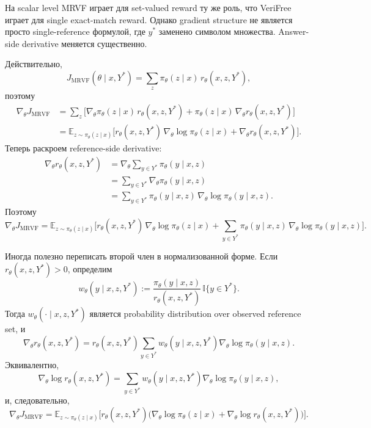 На scalar level MRVF играет для set-valued reward ту же роль, что VeriFree играет для single exact-match reward. Однако gradient structure не является просто single-reference формулой, где \(y^{*}\) заменено символом множества. Answer-side derivative меняется существенно.

Действительно,
\[
    J_{\mathrm{MRVF}}(\theta\mid x,Y^{*})
    =
    \sum_{z}\pi_{\theta}(z\mid x)\,r_{\theta}(x,z,Y^{*}),
\]
поэтому
\begin{align*}
    \nabla_{\theta}J_{\mathrm{MRVF}}
     & =
    \sum_{z}
    \Big[
        \nabla_{\theta}\pi_{\theta}(z\mid x)\,r_{\theta}(x,z,Y^{*})
        +
        \pi_{\theta}(z\mid x)\,\nabla_{\theta}r_{\theta}(x,z,Y^{*})
    \Big] \\
     & =
    \mathbb{E}_{z\sim\pi_{\theta}(z\mid x)}
    \Big[
        r_{\theta}(x,z,Y^{*})\,\nabla_{\theta}\log\pi_{\theta}(z\mid x)
        +
        \nabla_{\theta}r_{\theta}(x,z,Y^{*})
        \Big].
\end{align*}
Теперь раскроем reference-side derivative:
\begin{align*}
    \nabla_{\theta}r_{\theta}(x,z,Y^{*})
     & =
    \nabla_{\theta}
    \sum_{y\in Y^{*}}\pi_{\theta}(y\mid x,z) \\
     & =
    \sum_{y\in Y^{*}}
    \nabla_{\theta}\pi_{\theta}(y\mid x,z)   \\
     & =
    \sum_{y\in Y^{*}}
    \pi_{\theta}(y\mid x,z)\,\nabla_{\theta}\log\pi_{\theta}(y\mid x,z).
\end{align*}
Поэтому
\[
    \nabla_{\theta}J_{\mathrm{MRVF}}
    =
    \mathbb{E}_{z\sim\pi_{\theta}(z\mid x)}
    \Bigg[
        r_{\theta}(x,z,Y^{*})\,\nabla_{\theta}\log\pi_{\theta}(z\mid x)
        +
        \sum_{y\in Y^{*}}
        \pi_{\theta}(y\mid x,z)\,\nabla_{\theta}\log\pi_{\theta}(y\mid x,z)
        \Bigg].
\]

Иногда полезно переписать второй член в нормализованной форме. Если \(r_{\theta}(x,z,Y^{*})>0\), определим
\[
    w_{\theta}(y\mid x,z,Y^{*})
    :=
    \frac{\pi_{\theta}(y\mid x,z)}{r_{\theta}(x,z,Y^{*})}
    \,\mathbb{I}\{y\in Y^{*}\}.
\]
Тогда \(w_{\theta}(\cdot\mid x,z,Y^{*})\) является probability distribution over observed reference set, и
\[
    \nabla_{\theta}r_{\theta}(x,z,Y^{*})
    =
    r_{\theta}(x,z,Y^{*})
    \sum_{y\in Y^{*}}
    w_{\theta}(y\mid x,z,Y^{*})
    \nabla_{\theta}\log\pi_{\theta}(y\mid x,z).
\]
Эквивалентно,
\[
    \nabla_{\theta}\log r_{\theta}(x,z,Y^{*})
    =
    \sum_{y\in Y^{*}}
    w_{\theta}(y\mid x,z,Y^{*})
    \nabla_{\theta}\log\pi_{\theta}(y\mid x,z),
\]
и, следовательно,
\[
    \nabla_{\theta}J_{\mathrm{MRVF}}
    =
    \mathbb{E}_{z\sim\pi_{\theta}(z\mid x)}
    \Big[
        r_{\theta}(x,z,Y^{*})
        \big(
        \nabla_{\theta}\log\pi_{\theta}(z\mid x)
        +
        \nabla_{\theta}\log r_{\theta}(x,z,Y^{*})
        \big)
        \Big].
\]

